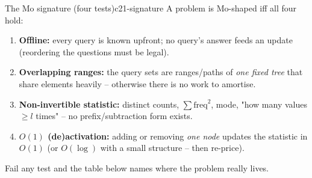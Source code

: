 \begin{definition}{The Mo signature (four tests)}{c21-signature}
A problem is Mo-shaped iff all four hold:
\begin{enumerate}[nosep,leftmargin=1.6em]
  \item \textbf{Offline:} every query is known upfront; no query's answer
        feeds an update (reordering the questions must be legal).
  \item \textbf{Overlapping ranges:} the query sets are ranges/paths of
        \emph{one fixed tree} that share elements heavily -- otherwise there
        is no work to amortise.
  \item \textbf{Non-invertible statistic:} distinct counts,
        \(\sum\mathrm{freq}^2\), mode, "how many values \(\ge l\) times" --
        no prefix/subtraction form exists.
  \item \textbf{\(O(1)\) (de)activation:} adding or removing \emph{one node}
        updates the statistic in \(O(1)\) (or \(O(\log)\) with a small
        structure -- then re-price).
\end{enumerate}
Fail any test and the table below names where the problem really lives.
\end{definition}

